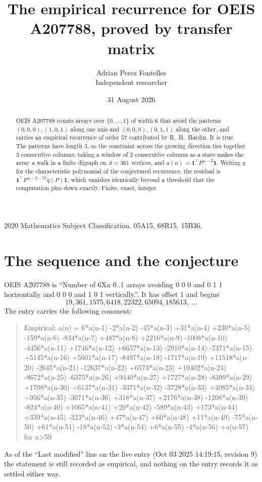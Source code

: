 \documentclass[11pt,a4paper]{article}
\title{The empirical recurrence for OEIS A207788, proved by transfer matrix}
\author{Adrian Perez Fontelles\\ \small Independent researcher}
\date{31 August 2026}
\theoremstyle{plain}
\theoremstyle{definition}
\begin{document}
\maketitle

\begin{abstract}
OEIS A207788 counts arrays over $\{0,\dots,1\}$ of width $6$ that avoid the patterns
$(0,0,0), (1,0,1)$ along one axis and $(0,0,0), (0,1,1)$ along the other, and carries an empirical recurrence of
order $57$ contributed by R.~H.~Hardin. It is true. The patterns have length $3$, so
the constraint across the growing direction ties together $3$ consecutive columns: taking a
window of $2$ consecutive columns as a state makes the array a walk in a finite digraph
on $S=361$ vertices, and $a(n)=\mathbf{1}^{\!\top}P^{\,n-2}\mathbf{1}$. Writing $q$
for the characteristic polynomial of the conjectured recurrence, the residual is
$\mathbf{1}^{\!\top}P^{\,n-2-57}q(P)\mathbf{1}$, which vanishes identically
beyond a threshold that the computation pins down exactly. Finite, exact, integer.
\end{abstract}

\noindent\small 2020 Mathematics Subject Classification. 05A15, 68R15, 15B36.\normalsize

\section{The sequence and the conjecture}

OEIS A207788 is ``Number of 6Xn 0..1 arrays avoiding 0 0 0 and 0 1 1 horizontally and 0 0 0 and 1 0 1 vertically.''. It has offset
$1$ and begins
\[
19, 361, 1575, 6418, 22322, 65094, 185613,\ \dots
\]
The entry carries the following comment:
\begin{quote}\small
Empirical: a(n) = 6*a(n-1) -2*a(n-2) -45*a(n-3) +31*a(n-4) +230*a(n-5) -159*a(n-6) -834*a(n-7) +487*a(n-8) +2216*a(n-9) -1008*a(n-10) -4456*a(n-11) +1746*a(n-12) +6657*a(n-13) -2910*a(n-14) -7371*a(n-15) +5145*a(n-16) +5601*a(n-17) -8497*a(n-18) -1717*a(n-19) +11518*a(n-20) -2645*a(n-21) -12637*a(n-22) +6573*a(n-23) +10402*a(n-24) -8672*a(n-25) -6375*a(n-26) +9440*a(n-27) +1727*a(n-28) -8399*a(n-29) +1708*a(n-30) +6137*a(n-31) -3371*a(n-32) -3728*a(n-33) +4085*a(n-34) +956*a(n-35) -3071*a(n-36) +318*a(n-37) +2176*a(n-38) -1208*a(n-39) -824*a(n-40) +1065*a(n-41) +20*a(n-42) -589*a(n-43) +173*a(n-44) +339*a(n-45) -323*a(n-46) +47*a(n-47) +60*a(n-48) +11*a(n-49) -75*a(n-50) +61*a(n-51) -18*a(n-52) -3*a(n-54) +6*a(n-55) -4*a(n-56) +a(n-57) for n>59
\end{quote}
As of the ``Last modified'' line on the live entry (Oct 03 2025 14:19:15, revision
9) the statement is still recorded as empirical, and nothing on the entry
records it as settled either way.
\end{document}
